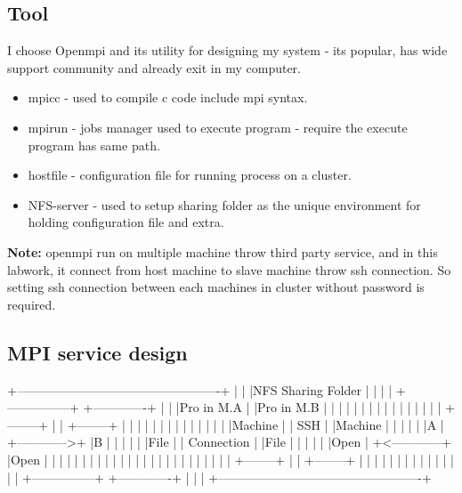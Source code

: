 \documentclass{article}
\begin{document}
\subsection{Tool}
I choose Openmpi and its utility for designing my system - its popular, has wide support community and already exit in my computer.
\begin{itemize}
\item mpicc - used to compile c code include mpi syntax.
\item mpirun - jobs manager used to execute program - require the execute program has same path.
\item hostfile - configuration file for running process on a cluster.
\item NFS-server - used to setup sharing folder as the unique environment for holding configuration file and extra.
\end{itemize}
\textbf{Note:} openmpi run on multiple machine throw third party service, and in this labwork, it connect from host machine to
slave machine throw ssh connection. So setting ssh connection between each machines in cluster without password is required.

\subsection{MPI service design}
+-------------------------------------------------+
|                                                 |
|NFS Sharing Folder                               |
|                                                 |
|  +---------------+             +-------------+  |
|  |Pro in M.A     |             |Pro in M.B   |  |
|  |               |             |             |  |
|  |               |             |             |  |
|  |  +--------+   |             | +--------+  |  |
|  |  |        |   |             | |        |  |  |
|  |  |Machine |   |   SSH       | |Machine |  |  |
|  |  |A       |   +------------>+ |B       |  |  |
|  |  |File    |   | Connection  | |File    |  |  |
|  |  |Open    |   +<------------+ |Open    |  |  |
|  |  |        |   |             | |        |  |  |
|  |  |        |   |             | |        |  |  |
|  |  +--------+   |             | +--------+  |  |
|  |               |             |             |  |
|  |               |             |             |  |
|  +---------------+             +-------------+  |
|                                                 |
+-------------------------------------------------+
\end{document}
